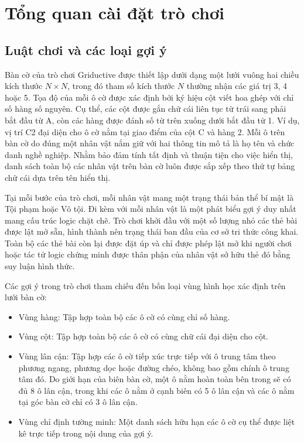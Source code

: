 \chapter{Tổng quan cài đặt trò chơi}
\label{chap:tong-quan-cai-dat}

\section{Luật chơi và các loại gợi ý}
\label{sec:luat-choi-cac-loai-goi-y}

Bàn cờ của trò chơi Griductive được thiết lập dưới dạng một lưới vuông hai chiều kích thước $N \times N$, trong đó tham số kích thước $N$ thường nhận các giá trị 3, 4 hoặc 5. Tọa độ của mỗi ô cờ được xác định bởi ký hiệu cột viết hoa ghép với chỉ số hàng số nguyên. Cụ thể, các cột được gắn chữ cái liên tục từ trái sang phải bắt đầu từ A, còn các hàng được đánh số từ trên xuống dưới bắt đầu từ 1. Ví dụ, vị trí C2 đại diện cho ô cờ nằm tại giao điểm của cột C và hàng 2. Mỗi ô trên bàn cờ do đúng một nhân vật nắm giữ với hai thông tin mô tả là họ tên và chức danh nghề nghiệp. Nhằm bảo đảm tính tất định và thuận tiện cho việc hiển thị, danh sách toàn bộ các nhân vật trên bàn cờ luôn được sắp xếp theo thứ tự bảng chữ cái dựa trên tên hiển thị.

Tại mỗi bước của trò chơi, mỗi nhân vật mang một trạng thái bản thể bí mật là Tội phạm hoặc Vô tội. Đi kèm với mỗi nhân vật là một phát biểu gợi ý duy nhất mang cấu trúc logic chặt chẽ. Trò chơi khởi đầu với một số lượng nhỏ các thẻ bài được lật mở sẵn, hình thành nên trạng thái ban đầu của cơ sở tri thức công khai. Toàn bộ các thẻ bài còn lại được đặt úp và chỉ được phép lật mở khi người chơi hoặc tác tử logic chứng minh được thân phận của nhân vật sở hữu thẻ đó bằng suy luận hình thức.

Các gợi ý trong trò chơi tham chiếu đến bốn loại vùng hình học xác định trên lưới bàn cờ:
\begin{itemize}
    \item Vùng hàng: Tập hợp toàn bộ các ô cờ có cùng chỉ số hàng.
    \item Vùng cột: Tập hợp toàn bộ các ô cờ có cùng chữ cái đại diện cho cột.
    \item Vùng lân cận: Tập hợp các ô cờ tiếp xúc trực tiếp với ô trung tâm theo phương ngang, phương dọc hoặc đường chéo, không bao gồm chính ô trung tâm đó. Do giới hạn của biên bàn cờ, một ô nằm hoàn toàn bên trong sẽ có đủ 8 ô lân cận, trong khi các ô nằm ở cạnh biên có 5 ô lân cận và các ô nằm tại góc bàn cờ chỉ có 3 ô lân cận.
    \item Vùng chỉ định tường minh: Một danh sách hữu hạn các ô cờ cụ thể được liệt kê trực tiếp trong nội dung của gợi ý.
\end{itemize}

